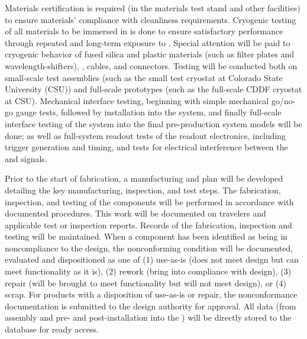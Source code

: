 Materials certification is required (in the  materials test
stand and other facilities) to ensure materials' compliance with
cleanliness requirements. Cryogenic testing of all materials to be
immersed in  is done to ensure satisfactory performance through repeated
and long-term exposure to . Special attention will be paid to
cryogenic behavior of fused silica and plastic materials (such as
filter plates and wavelength-shifters), , cables, and
connectors. Testing will be conducted both on small-scale test
assemblies (such as the small test cryostat at Colorado State University (CSU)) and full-scale
prototypes (such as the full-scale CDDF cryostat at CSU). Mechanical
interface testing, beginning with simple mechanical go/no-go gauge
tests, followed by installation into the  system, and
finally full-scale interface testing of the  system into the final
pre-production  system models will be done; as well as full-system readout tests of the
 readout electronics, including trigger generation and timing,
and tests for electrical interference between the  and 
signals.

Prior to the start of fabrication, a manufacturing and  plan will be
developed detailing the key manufacturing, inspection, and test
steps. The fabrication, inspection, and testing of the components will
be performed in accordance with documented procedures. This work will
be documented on travelers and applicable test or inspection
reports. Records of the fabrication, inspection and testing will be
maintained. When a component has been identified as being in
noncompliance to the design, the nonconforming condition will be
documented, evaluated and dispositioned as one of (1) use-as-is (does not meet
design but can meet functionality as it is), (2) rework (bring into
compliance with design), (3) repair (will be brought to meet functionality
but will not meet design), or (4) scrap. For products with a disposition
of use-as-is or repair, the nonconformance documentation is
submitted to the design authority for approval. All  data (from
assembly and pre- and post-installation into the ) will be directly
stored to the  database for ready access. %

